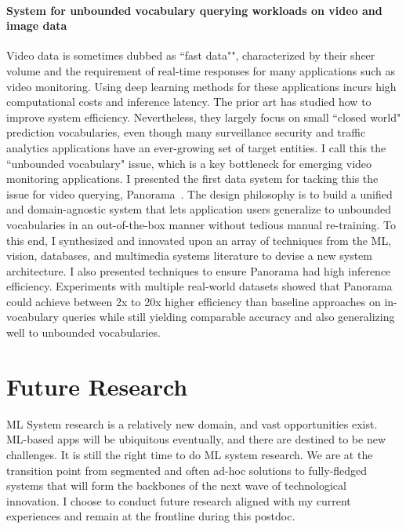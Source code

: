 \documentclass[letterpaper]{article}
\begin{document}
\paragraph{System for unbounded vocabulary querying workloads on video and image data} Video data is sometimes dubbed as ``fast data"", characterized by their sheer volume and the requirement of real-time responses for many applications such as video monitoring. Using deep learning methods for these applications incurs high computational costs and inference latency. The prior art has studied how to improve system efficiency. Nevertheless, they largely focus on small ``closed world" prediction vocabularies, even though many surveillance security and traffic analytics applications have an ever-growing set of target entities. I call this the ``unbounded vocabulary" issue, which is a key bottleneck for emerging video monitoring applications. I presented the first data system for tacking this
the issue for video querying, Panorama~\cite{panorama}. The design philosophy
is to build a unified and domain-agnostic system that lets
application users generalize to unbounded vocabularies in an
out-of-the-box manner without tedious manual re-training.
To this end, I synthesized and innovated upon an array of
techniques from the ML, vision, databases, and multimedia systems literature to devise a new system architecture.
I also presented techniques to ensure Panorama had high
inference efficiency. Experiments with multiple real-world
datasets showed that Panorama could achieve between 2x to 20x
higher efficiency than baseline approaches on in-vocabulary
queries while still yielding comparable accuracy and also
generalizing well to unbounded vocabularies.

\section*{Future Research}
ML System research is a relatively new domain, and vast opportunities exist. ML-based apps will be ubiquitous eventually, and there are destined to be new challenges. It is still the right time to do ML system research. We are at the transition point from segmented and often ad-hoc solutions to fully-fledged systems that will form the backbones of the next wave of technological innovation. I choose to conduct future research aligned with my current experiences and remain at the frontline during this postdoc.
\end{document}
